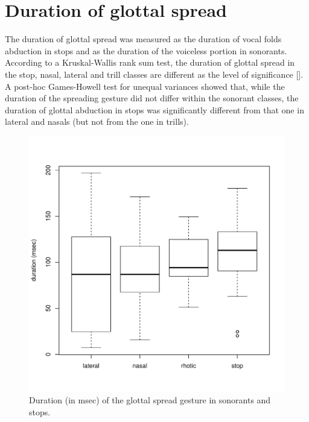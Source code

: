 \documentclass[11pt,a4paper,openany]{memoir}\usepackage[]{graphicx}\usepackage[]{color}
\newenvironment{knitrout}{}{} %
\begin{document}
\section{Duration of glottal spread}
\label{s:gs}
The duration of glottal spread was measured as the duration of vocal folds abduction in stops and as the duration of the voiceless portion in sonorants.
According to a Kruskal-Wallis rank sum test, the duration of glottal spread in the stop, nasal, lateral and trill classes are different as the level of significance [].
A post-hoc Games-Howell test for unequal variances showed that, while the duration of the spreading gesture did not differ within the sonorant classes, the duration of glottal abduction in stops was significantly different from that one in lateral and nasals (but not from the one in trills).

\begin{figure}
\centering
\begin{knitrout}
\color{fgcolor}
\includegraphics[width=\textwidth]{img/gs-box-1} 

\end{knitrout}
\caption{Duration (in msec) of the glottal spread gesture in sonorants and stops.}
\label{}
\end{figure}
\end{document}
